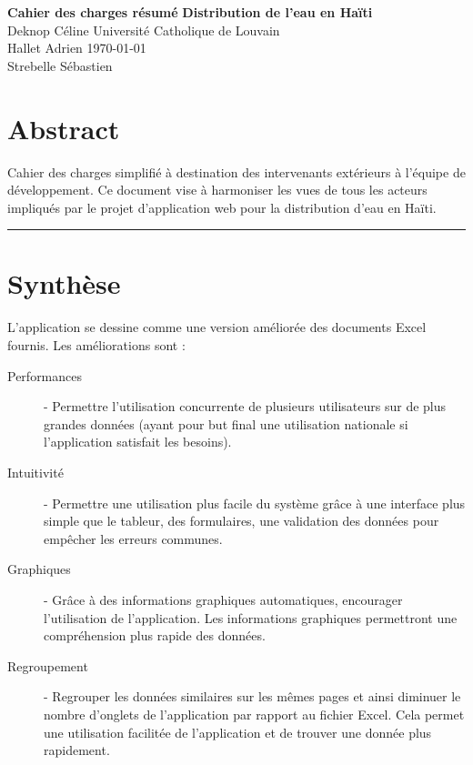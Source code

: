 \documentclass[a4paper, 11pt]{article}
\begin{document}
\noindent
\large\textbf{Cahier des charges résumé} \hfill \textbf{Distribution de l'eau en Haïti} \\
\normalsize Deknop Céline \hfill Université Catholique de Louvain \\
Hallet Adrien \hfill \today \\
Strebelle Sébastien

\section*{Abstract}
Cahier des charges simplifié à destination des intervenants extérieurs à l'équipe de développement. Ce document vise à harmoniser les vues de tous les acteurs impliqués par le projet d'application web pour la distribution d'eau en Haïti.
\hrule

\section{Synthèse}
  L'application se dessine comme une version améliorée des documents Excel fournis. Les améliorations sont :
  \begin{description}
    \item[Performances] - Permettre l'utilisation concurrente de plusieurs utilisateurs sur de plus grandes données (ayant pour but final une utilisation nationale si l'application satisfait les besoins).
    \item[Intuitivité] - Permettre une utilisation plus facile du système grâce à une interface plus simple que le tableur, des formulaires, une validation des données pour empêcher les erreurs communes.
    \item[Graphiques] - Grâce à des informations graphiques automatiques, encourager l'utilisation de l'application. Les informations graphiques permettront une compréhension plus rapide des données.
    \item[Regroupement] - Regrouper les données similaires sur les mêmes pages et ainsi diminuer le nombre d'onglets de l'application par rapport au fichier Excel. Cela permet une utilisation facilitée de l'application et de trouver une donnée plus rapidement.
  \end{description}
\end{document}
